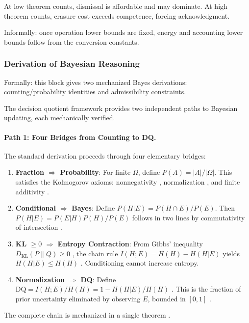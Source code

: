 \begin{corollary}\label{cor:theorem-equilibrium}
At low theorem counts, dismissal is affordable and may dominate. At high theorem counts, erasure cost exceeds competence, forcing acknowledgment.
\end{corollary}

Informally: once operation lower bounds are fixed, energy and accounting lower bounds follow from the conversion constants.

\subsubsection{Derivation of Bayesian Reasoning}

Formally: this block gives two mechanized Bayes derivations: counting/probability identities and admissibility constraints.

The decision quotient framework provides two independent paths to Bayesian updating, each mechanically verified.

\paragraph{Path 1: Four Bridges from Counting to DQ.}
The standard derivation proceeds through four elementary bridges:
\begin{enumerate}
  \item \textbf{Fraction $\Rightarrow$ Probability}: For finite $\Omega$, define $P(A) = |A|/|\Omega|$. This satisfies the Kolmogorov axioms: nonnegativity , normalization , and finite additivity .
  \item \textbf{Conditional $\Rightarrow$ Bayes}: Define $P(H|E) = P(H \cap E)/P(E)$. Then $P(H|E) = P(E|H) P(H) / P(E)$ follows in two lines by commutativity of intersection .
  \item \textbf{KL $\geq 0$ $\Rightarrow$ Entropy Contraction}: From Gibbs' inequality $D_{\text{KL}}(P \| Q) \geq 0$ , the chain rule $I(H;E) = H(H) - H(H|E)$ yields $H(H|E) \leq H(H)$ . Conditioning cannot increase entropy.
  \item \textbf{Normalization $\Rightarrow$ DQ}: Define $\text{DQ} = I(H;E)/H(H) = 1 - H(H|E)/H(H)$ . This is the fraction of prior uncertainty eliminated by observing $E$, bounded in $[0,1]$ .
\end{enumerate}
The complete chain is mechanized in a single theorem .

